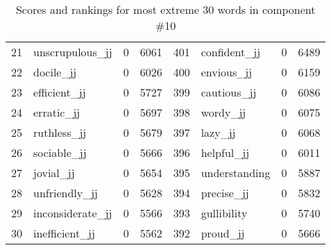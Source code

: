 \begin{table}[tbp]
\begin{tabular}{| rlr@{.}l | rlr@{.}l |}
    21 & unscrupulous\_jj & 0 & 6061    &    401 & confident\_jj & 0 & 6489 \\
    22 & docile\_jj & 0 & 6026    &    400 & envious\_jj & 0 & 6159 \\
    23 & efficient\_jj & 0 & 5727    &    399 & cautious\_jj & 0 & 6086 \\
    24 & erratic\_jj & 0 & 5697    &    398 & wordy\_jj & 0 & 6075 \\
    25 & ruthless\_jj & 0 & 5679    &    397 & lazy\_jj & 0 & 6068 \\
    26 & sociable\_jj & 0 & 5666    &    396 & helpful\_jj & 0 & 6011 \\
    27 & jovial\_jj & 0 & 5654    &    395 & understanding & 0 & 5887 \\
    28 & unfriendly\_jj & 0 & 5628    &    394 & precise\_jj & 0 & 5832 \\
    29 & inconsiderate\_jj & 0 & 5566    &    393 & gullibility & 0 & 5740 \\
    30 & inefficient\_jj & 0 & 5562    &    392 & proud\_jj & 0 & 5666 \\
    \hline
    \end{tabular}
    \caption{Scores and rankings for most extreme 30 words in component \#10} 
\end{table}
\clearpage
